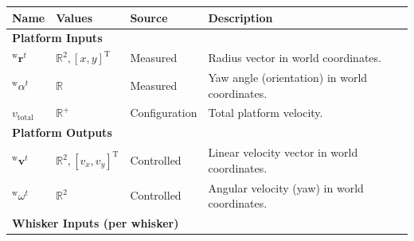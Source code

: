 \begin{table}[htb]
    \centering
    \begin{tabular}{p{1cm} p{2cm} p{3cm} p{8cm}}
        \toprule
        \textbf{Name}                                        & \textbf{Values}                                                   & \textbf{Source}                                         & \textbf{Description}                                                                                                        \\
        \midrule
        \multicolumn{4}{l}{\textbf{Platform Inputs}} \\
        \midrule
        \(^{\mathrm{w}}\boldsymbol{r}^{t}\)                  & \(\mathbb{R}^2, [x, y]^\mathrm{T}\)                               & Measured                                                & Radius vector in world coordinates.                                                                                         \\
        \(^{\mathrm{w}}\alpha^{t}\)                          & \(\mathbb{R}\)                                                    & Measured                                                & Yaw angle (orientation) in world coordinates.                                                                               \\
        \(v_{\mathrm{total}}\)                               & \(\mathbb{R}^{+}\)                                                & Configuration                                           & Total platform velocity.                                                                                                    \\
        \midrule
        \multicolumn{4}{l}{\textbf{Platform Outputs}} \\
        \midrule
        \(^{\mathrm{w}}\boldsymbol{v}^{t}\)                  & \(\mathbb{R}^2, [v_x, v_y]^\mathrm{T}\)                           & Controlled                                              & Linear velocity vector in world coordinates.                                                                                \\
        \(^{\mathrm{w}}\omega^{t}\)                          & \(\mathbb{R}^2\)                                                  & Controlled                                              & Angular velocity (yaw) in world coordinates.                                                                                \\
        \midrule
        \multicolumn{4}{l}{\textbf{Whisker Inputs (per whisker)}} \\

\end{tabular}
\end{table}
